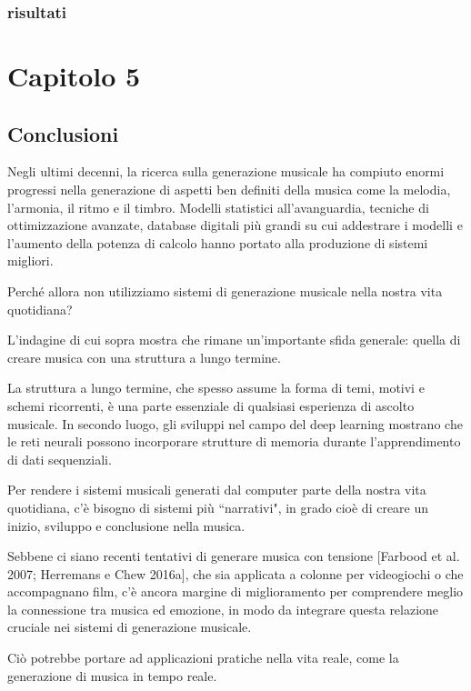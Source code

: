\documentclass[a4paper,12pt]{report}
\begin{document}
\subsection*{risultati}



\chapter*{Capitolo 5}
\section*{Conclusioni}

Negli ultimi decenni, la ricerca sulla generazione musicale ha compiuto enormi progressi nella generazione di aspetti ben definiti della musica come la melodia, l’armonia, il ritmo e il timbro. 
Modelli statistici all’avanguardia, tecniche di ottimizzazione avanzate, database digitali più grandi su cui addestrare i modelli e l’aumento della potenza di calcolo hanno portato alla produzione di sistemi migliori. 

Perché allora non utilizziamo sistemi di generazione musicale nella nostra vita quotidiana? 

L’indagine di cui sopra mostra che rimane un’importante sfida generale: quella di creare musica con una struttura a lungo termine.

La struttura a lungo termine, che spesso assume la forma di temi, motivi e schemi ricorrenti, è una parte essenziale di qualsiasi esperienza di ascolto musicale. In secondo luogo, gli sviluppi nel campo del deep learning mostrano che le reti neurali possono incorporare strutture di memoria durante l'apprendimento di dati sequenziali. 

Per rendere i sistemi musicali generati dal computer parte della nostra vita quotidiana, c’è bisogno di sistemi più “narrativi", in grado cioè di creare un inizio, sviluppo e conclusione nella musica. 

Sebbene ci siano recenti tentativi di generare musica con tensione [Farbood et al. 2007; Herremans e Chew 2016a], che sia applicata a colonne per videogiochi o che accompagnano film, c’è ancora margine di miglioramento per comprendere meglio la connessione tra musica ed emozione, 
in modo da integrare questa relazione cruciale nei sistemi di generazione musicale. 

Ciò potrebbe portare ad applicazioni pratiche nella vita reale, come la generazione di musica in tempo reale.
\end{document}
